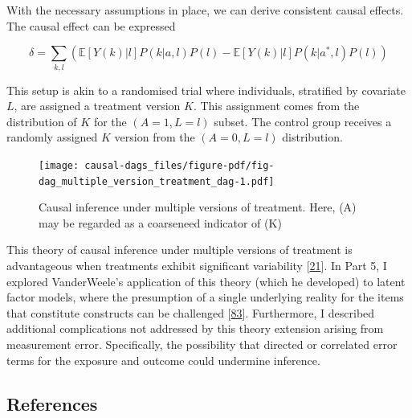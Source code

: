 \documentclass[
  singlecolumn]{article}
\begin{document}
With the necessary assumptions in place, we can derive consistent causal
effects. The causal effect can be expressed

\[\delta = \sum_{k,l} \left( \mathbb{E}[Y(k)|l] P(k|a,l) P(l) - \mathbb{E}[Y(k)|l] P(k|a^*,l) P(l) \right) \]

This setup is akin to a randomised trial where individuals, stratified
by covariate \(L\), are assigned a treatment version \(K\). This
assignment comes from the distribution of \(K\) for the
\((A = 1, L = l)\) subset. The control group receives a randomly
assigned \(K\) version from the \((A = 0, L = l)\) distribution.

\begin{figure}

{\centering \texttt{[image: causal-dags\_files/figure-pdf/fig-dag\_multiple\_version\_treatment\_dag-1.pdf]}

}

\caption{\label{fig-dag_multiple_version_treatment_dag}Causal inference
under multiple versions of treatment. Here, (A) may be regarded as a
coarseneed indicator of (K)}

\end{figure}

This theory of causal inference under multiple versions of treatment is
advantageous when treatments exhibit significant variability
{[}\protect\hyperlink{ref-vanderweele2013}{21}{]}. In Part 5, I explored
VanderWeele's application of this theory (which he developed) to latent
factor models, where the presumption of a single underlying reality for
the items that constitute constructs can be challenged
{[}\protect\hyperlink{ref-vanderweele2022}{83}{]}. Furthermore, I
described additional complications not addressed by this theory
extension arising from measurement error. Specifically, the possibility
that directed or correlated error terms for the exposure and outcome
could undermine inference.

\newpage{}

\hypertarget{references}{%
\subsection{References}\label{references}}
\end{document}
